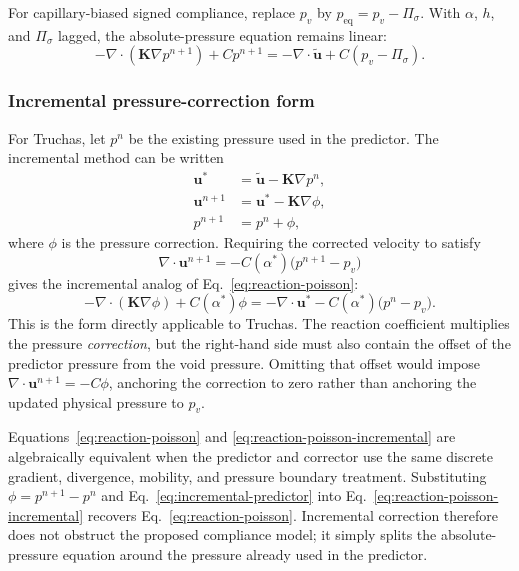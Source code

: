\documentclass[11pt]{article}
\newcommand{\divg}{\nabla\!\cdot}
\newcommand{\uv}{\boldsymbol{u}}
\begin{document}
For capillary-biased signed compliance, replace \(p_v\) by
\(p_{\mathrm{eq}}=p_v-\Pi_\sigma\).  With \(\alpha\), \(h\), and \(\Pi_\sigma\) lagged,
the absolute-pressure equation remains linear:
\begin{equation}
  -\divg(\boldsymbol K\nabla p^{n+1})+Cp^{n+1}
  =-\divg\widetilde{\uv}+C(p_v-\Pi_\sigma).
  \label{eq:capillary-absolute}
\end{equation}

\subsubsection{Incremental pressure-correction form}

For Truchas, let \(p^n\) be the existing pressure used in the predictor.  The incremental
method can be written
\begin{align}
  \uv^* &= \widetilde{\uv}-\boldsymbol{K}\nabla p^n,
  \label{eq:incremental-predictor}\\
  \uv^{n+1} &= \uv^*-\boldsymbol{K}\nabla\phi,
  \label{eq:incremental-velocity}\\
  p^{n+1} &= p^n+\phi,
  \label{eq:incremental-pressure}
\end{align}
where \(\phi\) is the pressure correction.  Requiring the corrected velocity to satisfy
\begin{equation}
  \divg\uv^{n+1}=-C(\alpha^*)\bigl(p^{n+1}-p_v\bigr)
\end{equation}
gives the incremental analog of Eq.~\eqref{eq:reaction-poisson}:
\begin{equation}
  \boxed{
  -\divg\!\left(\boldsymbol{K}\nabla\phi\right)
  +C(\alpha^*)\phi
  =-\divg\uv^*-C(\alpha^*)\bigl(p^n-p_v\bigr).}
  \label{eq:reaction-poisson-incremental}
\end{equation}
This is the form directly applicable to Truchas.  The reaction coefficient multiplies
the pressure \emph{correction}, but the right-hand side must also contain the offset of
the predictor pressure from the void pressure.  Omitting that offset would impose
\(\divg\uv^{n+1}=-C\phi\), anchoring the correction to zero rather than anchoring the
updated physical pressure to \(p_v\).

Equations~\eqref{eq:reaction-poisson} and
\eqref{eq:reaction-poisson-incremental} are algebraically equivalent when the predictor
and corrector use the same discrete gradient, divergence, mobility, and pressure boundary
treatment.  Substituting \(\phi=p^{n+1}-p^n\) and
Eq.~\eqref{eq:incremental-predictor} into
Eq.~\eqref{eq:reaction-poisson-incremental} recovers
Eq.~\eqref{eq:reaction-poisson}.  Incremental correction therefore does not obstruct the
proposed compliance model; it simply splits the absolute-pressure equation around the
pressure already used in the predictor.
\end{document}
